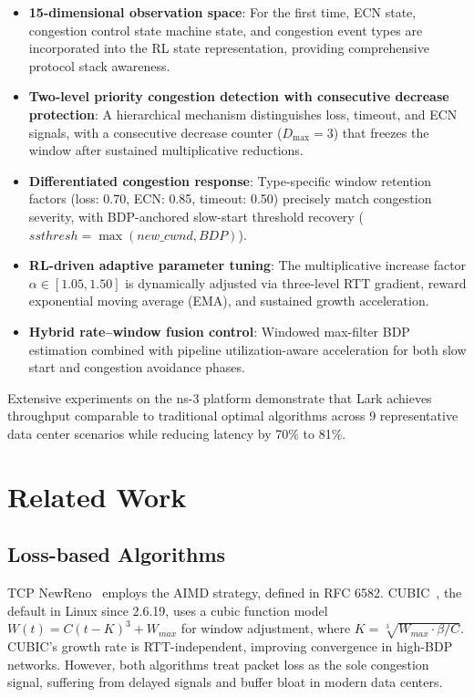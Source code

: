 \documentclass[10pt,twocolumn]{article}
\begin{document}
\begin{itemize}
\item \textbf{15-dimensional observation space}: For the first time, ECN state, congestion control state machine state, and congestion event types are incorporated into the RL state representation, providing comprehensive protocol stack awareness.
\item \textbf{Two-level priority congestion detection with consecutive decrease protection}: A hierarchical mechanism distinguishes loss, timeout, and ECN signals, with a consecutive decrease counter ($D_{\max}=3$) that freezes the window after sustained multiplicative reductions.
\item \textbf{Differentiated congestion response}: Type-specific window retention factors (loss: 0.70, ECN: 0.85, timeout: 0.50) precisely match congestion severity, with BDP-anchored slow-start threshold recovery ($ssthresh = \max(new\_cwnd, BDP)$).
\item \textbf{RL-driven adaptive parameter tuning}: The multiplicative increase factor $\alpha \in [1.05, 1.50]$ is dynamically adjusted via three-level RTT gradient, reward exponential moving average (EMA), and sustained growth acceleration.
\item \textbf{Hybrid rate--window fusion control}: Windowed max-filter BDP estimation combined with pipeline utilization-aware acceleration for both slow start and congestion avoidance phases.
\end{itemize}

Extensive experiments on the ns-3 platform demonstrate that Lark achieves throughput comparable to traditional optimal algorithms across 9 representative data center scenarios while reducing latency by 70\% to 81\%.

\section{Related Work}

\subsection{Loss-based Algorithms}

TCP NewReno~\cite{newreno} employs the AIMD strategy, defined in RFC 6582. CUBIC~\cite{cubic}, the default in Linux since 2.6.19, uses a cubic function model $W(t) = C(t-K)^3 + W_{max}$ for window adjustment, where $K = \sqrt[3]{W_{max} \cdot \beta / C}$. CUBIC's growth rate is RTT-independent, improving convergence in high-BDP networks. However, both algorithms treat packet loss as the sole congestion signal, suffering from delayed signals and buffer bloat in modern data centers.
\end{document}

